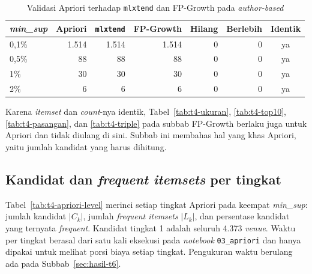 \begin{table}[ht]
\caption{Validasi Apriori terhadap \texttt{mlxtend} dan FP-Growth pada \textit{author-based}}
\label{tab:t4-apriori-validasi}
\small
\begin{tabular}{@{}lrrrrrc@{}}
\toprule
\textbf{\textit{min\_sup}} & \textbf{Apriori} & \textbf{\texttt{mlxtend}} & \textbf{FP-Growth} & \textbf{Hilang} & \textbf{Berlebih} & \textbf{Identik} \\
\midrule
0,1\% & 1.514 & 1.514 & 1.514 & 0 & 0 & ya \\
0,5\% & 88 & 88 & 88 & 0 & 0 & ya \\
1\% & 30 & 30 & 30 & 0 & 0 & ya \\
2\% & 6 & 6 & 6 & 0 & 0 & ya \\
\bottomrule
\end{tabular}
\end{table}

Karena \textit{itemset} dan \textit{count}-nya identik, Tabel~\ref{tab:t4-ukuran}, \ref{tab:t4-top10}, \ref{tab:t4-pasangan}, dan \ref{tab:t4-triple} pada subbab FP-Growth berlaku juga untuk Apriori dan tidak diulang di sini. Subbab ini membahas hal yang khas Apriori, yaitu jumlah kandidat yang harus dihitung.

\subsection{Kandidat dan \textit{frequent itemsets} per tingkat}
\label{sec:hasil-t4-apriori-kandidat}
Tabel~\ref{tab:t4-apriori-level} merinci setiap tingkat Apriori pada keempat \textit{min\_sup}: jumlah kandidat $|C_k|$, jumlah \textit{frequent itemsets} $|L_k|$, dan persentase kandidat yang ternyata \textit{frequent}. Kandidat tingkat 1 adalah seluruh 4.373 \textit{venue}. Waktu per tingkat berasal dari satu kali eksekusi pada \textit{notebook} \texttt{03\_apriori} dan hanya dipakai untuk melihat porsi biaya setiap tingkat. Pengukuran waktu berulang ada pada Subbab~\ref{sec:hasil-t6}.

